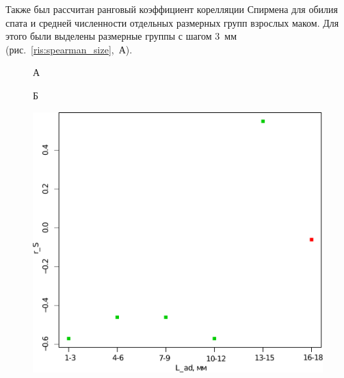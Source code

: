 Также был рассчитан ранговый коэффициент корелляции Спирмена для обилия спата и средней численности отдельных размерных групп взрослых маком. 
Для этого были выделены размерные группы с шагом $3$~мм (рис.~\ref{ris:spearman_size},~А).
	\begin{figure}[h]
	\begin{minipage}[b]{.46\linewidth}
	\begin{center}
	А
	\end{center}
	\end{minipage}
	\hfil %
	\begin{minipage}[b]{.46\linewidth}
	\begin{center}
	Б
	\end{center}
	\end{minipage}
	\begin{minipage}[b]{.46\linewidth}
	\begin{center}
		\includegraphics[width=\textwidth]{../White_Sea/spat/spearman_spat_3mm_1.pdf}
	\end{center}
	\end{minipage}
%
	\hfil %
	\begin{minipage}[b]{.46\linewidth}

\end{minipage}
\end{figure}

